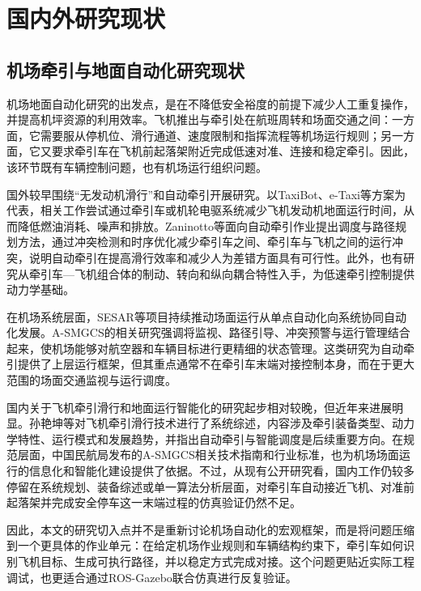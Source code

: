 \section{国内外研究现状}

\subsection{机场牵引与地面自动化研究现状}

机场地面自动化研究的出发点，是在不降低安全裕度的前提下减少人工重复操作，并提高机坪资源的利用效率\cite{ref1,ref2,ref3,ref4}。飞机推出与牵引处在航班周转和场面交通之间：一方面，它需要服从停机位、滑行通道、速度限制和指挥流程等机场运行规则；另一方面，它又要求牵引车在飞机前起落架附近完成低速对准、连接和稳定牵引。因此，该环节既有车辆控制问题，也有机场运行组织问题。

国外较早围绕``无发动机滑行''和自动牵引开展研究。以TaxiBot、e-Taxi等方案为代表，相关工作尝试通过牵引车或机轮电驱系统减少飞机发动机地面运行时间，从而降低燃油消耗、噪声和排放\cite{ref6,ref8,ref9}。Zaninotto等面向自动牵引作业提出调度与路径规划方法，通过冲突检测和时序优化减少牵引车之间、牵引车与飞机之间的运行冲突，说明自动牵引在提高滑行效率和减少人为差错方面具有可行性\cite{ref7}。此外，也有研究从牵引车---飞机组合体的制动、转向和纵向耦合特性入手，为低速牵引控制提供动力学基础\cite{ref6,ref10,ref19}。

在机场系统层面，SESAR等项目持续推动场面运行从单点自动化向系统协同自动化发展。A-SMGCS的相关研究强调将监视、路径引导、冲突预警与运行管理结合起来，使机场能够对航空器和车辆目标进行更精细的状态管理\cite{ref2,ref3,ref4}。这类研究为自动牵引提供了上层运行框架，但其重点通常不在牵引车末端对接控制本身，而在于更大范围的场面交通监视与运行调度。

国内关于飞机牵引滑行和地面运行智能化的研究起步相对较晚，但近年来进展明显。孙艳坤等对飞机牵引滑行技术进行了系统综述，内容涉及牵引装备类型、动力学特性、运行模式和发展趋势，并指出自动牵引与智能调度是后续重要方向\cite{ref6}。在规范层面，中国民航局发布的A-SMGCS相关技术指南和行业标准，也为机场场面运行的信息化和智能化建设提供了依据\cite{ref1,ref2}。不过，从现有公开研究看，国内工作仍较多停留在系统规划、装备综述或单一算法分析层面，对牵引车自动接近飞机、对准前起落架并完成安全停车这一末端过程的仿真验证仍然不足。

因此，本文的研究切入点并不是重新讨论机场自动化的宏观框架，而是将问题压缩到一个更具体的作业单元：在给定机场作业规则和车辆结构约束下，牵引车如何识别飞机目标、生成可执行路径，并以稳定方式完成对接。这个问题更贴近实际工程调试，也更适合通过ROS-Gazebo联合仿真进行反复验证。

